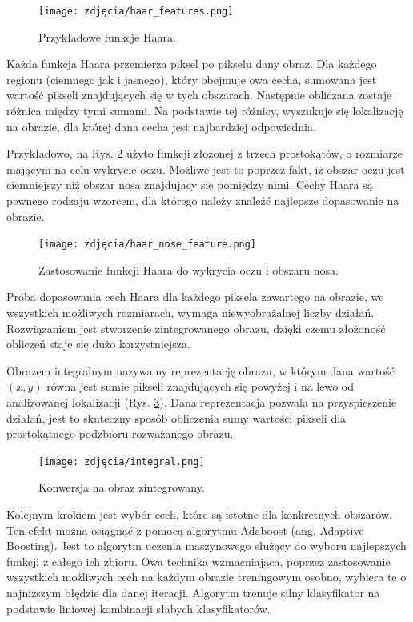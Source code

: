 \begin{figure}[h]
	\centering
	\texttt{[image: zdjęcia/haar\_features.png]}
	\caption{Przykładowe funkcje Haara. \cite{haarCascade}} 
	\label{fig:haarFeatures}
\end{figure}

Każda funkcja Haara przemierza piksel po pikselu dany obraz. Dla każdego regionu (ciemnego jak i jasnego), który obejmuje owa cecha, sumowana jest wartość pikseli znajdujących się w tych obszarach. Następnie obliczana zostaje różnica między tymi sumami. Na podstawie tej różnicy, wyszukuje się lokalizację na obrazie, dla której dana cecha jest najbardziej odpowiednia. 

Przykładowo, na Rys. \ref{fig:haarNose} użyto funkcji złożonej z trzech prostokątów, o rozmiarze mającym na celu wykrycie oczu. Możliwe jest to poprzez fakt, iż obszar oczu jest ciemniejszy niż obszar nosa znajdujacy się pomiędzy nimi. Cechy Haara są pewnego rodzaju wzorcem, dla którego należy znaleźć najlepsze dopasowanie na obrazie.
 
\begin{figure}[h]
	\centering
	\texttt{[image: zdjęcia/haar\_nose\_feature.png]}
	\caption{Zastosowanie funkcji Haara do wykrycia oczu i obszaru nosa.} 
	\label{fig:haarNose}
\end{figure}

Próba dopasowania cech Haara dla każdego piksela zawartego na obrazie, we wszystkich możliwych rozmiarach, wymaga niewyobrażalnej liczby działań. Rozwiązaniem jest stworzenie zintegrowanego obrazu, dzięki czemu złożoność obliczeń staje się dużo korzystniejsza.

Obrazem integralnym nazywamy reprezentację obrazu, w którym dana wartość $(x, y)$ równa jest sumie pikseli znajdujących się powyżej i na lewo od analizowanej lokalizacji (Rys. \ref{fig:integralImage}). Dana reprezentacja pozwala na przyspieszenie działań, jest to skuteczny sposób obliczenia sumy wartości pikseli dla prostokątnego podzbioru rozważanego obrazu.
 
 \begin{figure}[h]
	\centering
	\texttt{[image: zdjęcia/integral.png]}
	\caption{Konwersja na obraz zintegrowany. \cite{haarCascade}} 
	\label{fig:integralImage}
\end{figure}
 
Kolejnym krokiem jest wybór cech, które są istotne dla konkretnych obszarów. Ten efekt można osiągnąć z pomocą algorytmu Adaboost (ang. Adaptive Boosting). Jest to  algorytm uczenia maszynowego służący do wyboru najlepszych funkcji z całego ich zbioru. Owa technika wzmacniająca, poprzez zastosowanie wszystkich możliwych cech na każdym obrazie treningowym osobno, wybiera te o najniższym błędzie dla danej iteracji. Algorytm trenuje silny klasyfikator na podstawie liniowej kombinacji słabych klasyfikatorów.
 
